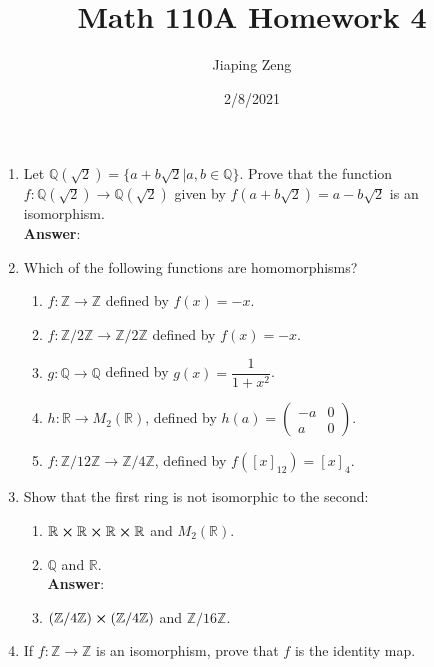 \documentclass{article}
\title{Math 110A Homework 4}
\date{2/8/2021}
\author{Jiaping Zeng}
\begin{document}
\maketitle

\begin{enumerate}
      \item Let $\mathbb{Q}(\sqrt 2) = \{a+b\sqrt{2}|a,b\in\mathbb{Q}\}$. Prove that the function $f:\mathbb{Q}(\sqrt 2)\to \mathbb{Q}(\sqrt 2)$ given by $f(a+b\sqrt 2) = a-b\sqrt 2$ is an isomorphism.\\
            \textbf{Answer}: 
      \item Which of the following functions are homomorphisms?
            \begin{enumerate}
                  \item $f:\mathbb{Z}\rightarrow\mathbb{Z}$ defined by $f(x)=-x$.
                  \item $f:\mathbb{Z}/2\mathbb{Z}\rightarrow\mathbb{Z}/2\mathbb{Z}$ defined by $f(x)=-x$.
                  \item $g:\mathbb{Q}\rightarrow\mathbb{Q}$ defined by $g(x)=\dfrac{1}{1+x^2}$.
                  \item $h:\mathbb{R}\rightarrow M_2(\mathbb{R})$, defined by $h(a)=\begin{pmatrix}-a&0\\a&0\end{pmatrix}$.
                  \item $f:\mathbb{Z}/12\mathbb{Z}\rightarrow\mathbb{Z}/4\mathbb{Z}$, defined by $f([x]_{12})=[x]_4$.
            \end{enumerate}
      \item Show that the first ring is not isomorphic to the second:
            \begin{enumerate}
                  \item $\mathbb{R}\cross\mathbb{R}\cross\mathbb{R}\cross\mathbb{R}$ and $M_2(\mathbb{R})$.
                  \item $\mathbb{Q}$ and $\mathbb{R}$.\\
                        \textbf{Answer}: 
                  \item $(\mathbb{Z}/4\mathbb{Z})\cross(\mathbb{Z}/4\mathbb{Z})$ and $\mathbb{Z}/16\mathbb{Z}$.
            \end{enumerate}
      \item If $f:\mathbb{Z}\rightarrow\mathbb{Z}$ is an isomorphism, prove that $f$ is the identity map.\\

\end{enumerate}
\end{document}
